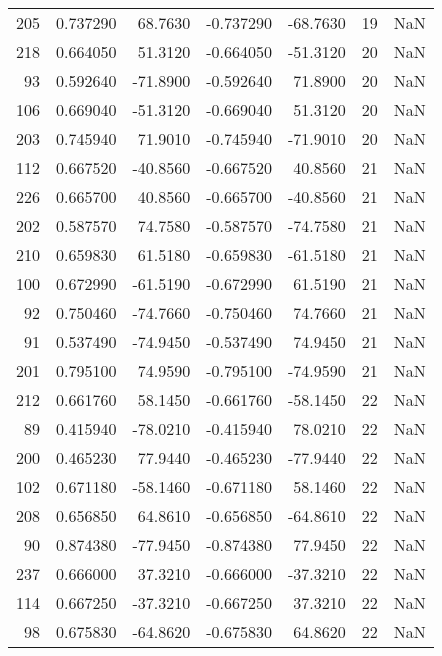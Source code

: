 \begin{tabular}{rrrrrrr}
205 &    0.737290 &   68.7630 &   -0.737290 &    -68.7630 &          19 & NaN \\
218 &    0.664050 &   51.3120 &   -0.664050 &    -51.3120 &          20 & NaN \\
 93 &    0.592640 &  -71.8900 &   -0.592640 &     71.8900 &          20 & NaN \\
106 &    0.669040 &  -51.3120 &   -0.669040 &     51.3120 &          20 & NaN \\
203 &    0.745940 &   71.9010 &   -0.745940 &    -71.9010 &          20 & NaN \\
112 &    0.667520 &  -40.8560 &   -0.667520 &     40.8560 &          21 & NaN \\
226 &    0.665700 &   40.8560 &   -0.665700 &    -40.8560 &          21 & NaN \\
202 &    0.587570 &   74.7580 &   -0.587570 &    -74.7580 &          21 & NaN \\
210 &    0.659830 &   61.5180 &   -0.659830 &    -61.5180 &          21 & NaN \\
100 &    0.672990 &  -61.5190 &   -0.672990 &     61.5190 &          21 & NaN \\
 92 &    0.750460 &  -74.7660 &   -0.750460 &     74.7660 &          21 & NaN \\
 91 &    0.537490 &  -74.9450 &   -0.537490 &     74.9450 &          21 & NaN \\
201 &    0.795100 &   74.9590 &   -0.795100 &    -74.9590 &          21 & NaN \\
212 &    0.661760 &   58.1450 &   -0.661760 &    -58.1450 &          22 & NaN \\
 89 &    0.415940 &  -78.0210 &   -0.415940 &     78.0210 &          22 & NaN \\
200 &    0.465230 &   77.9440 &   -0.465230 &    -77.9440 &          22 & NaN \\
102 &    0.671180 &  -58.1460 &   -0.671180 &     58.1460 &          22 & NaN \\
208 &    0.656850 &   64.8610 &   -0.656850 &    -64.8610 &          22 & NaN \\
 90 &    0.874380 &  -77.9450 &   -0.874380 &     77.9450 &          22 & NaN \\
237 &    0.666000 &   37.3210 &   -0.666000 &    -37.3210 &          22 & NaN \\
114 &    0.667250 &  -37.3210 &   -0.667250 &     37.3210 &          22 & NaN \\
 98 &    0.675830 &  -64.8620 &   -0.675830 &     64.8620 &          22 & NaN \\

\end{tabular}
